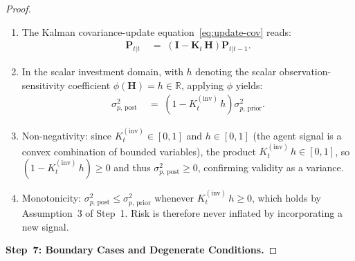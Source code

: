 \documentclass[12pt,openany]{book}
\numberwithin{equation}{chapter}
\theoremstyle{plain}
\theoremstyle{definition}
\theoremstyle{remark}
\begin{document}
\begin{proof}
\begin{enumerate}
  \item The Kalman covariance-update equation~\eqref{eq:update-cov}
        reads:
        \begin{align}
          \mathbf{P}_{t|t}
          &\;=\;
          \left(\mathbf{I} - \mathbf{K}_t\,\mathbf{H}\right)
          \mathbf{P}_{t|t-1}.
          \label{eq:kalman-cov-update-proof}
        \end{align}
  \item In the scalar investment domain, with $h$ denoting the
        scalar observation-sensitivity coefficient
        $\phi(\mathbf{H}) = h \in \mathbb{R}$, applying $\phi$
        yields:
        \begin{align}
          \sigma_{p,\,\text{post}}^2
          &\;=\;
          \left(1 - K_t^{(\mathrm{inv})}\,h\right)
          \sigma_{p,\,\text{prior}}^2.
          \label{eq:inv-cov-update-proof}
        \end{align}
  \item Non-negativity: since $K_t^{(\mathrm{inv})} \in [0,1]$
        and $h \in [0,1]$ (the agent signal is a convex
        combination of bounded variables), the product
        $K_t^{(\mathrm{inv})}\,h \in [0,1]$, so
        $(1 - K_t^{(\mathrm{inv})}\,h) \geq 0$ and thus
        $\sigma_{p,\,\text{post}}^2 \geq 0$, confirming
        validity as a variance.
  \item Monotonicity: $\sigma_{p,\,\text{post}}^2 \leq
        \sigma_{p,\,\text{prior}}^2$ whenever
        $K_t^{(\mathrm{inv})}\,h \geq 0$, which holds by
        Assumption~3 of Step~1.  Risk is therefore never
        inflated by incorporating a new signal.
\end{enumerate}

\medskip
\noindent\textbf{Step~7: Boundary Cases and Degenerate
Conditions.}


\end{proof}
\end{document}
